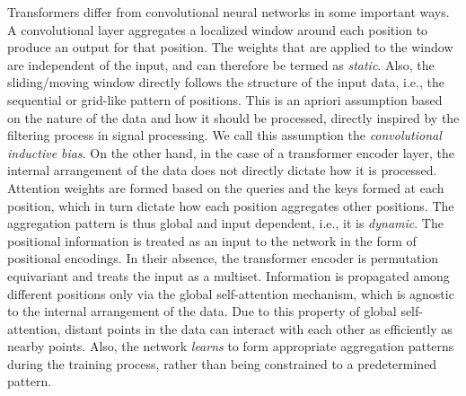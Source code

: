 \documentclass[sigconf,authorversion]{acmart}
\begin{document}
Transformers differ from convolutional neural networks in some important ways. A convolutional layer aggregates a localized window around each position to produce an output for that position. The weights that are applied to the window are independent of the input, and can therefore be termed as \emph{static}. Also, the sliding/moving window directly follows the structure of the input data, i.e., the sequential or grid-like pattern of positions. This is an apriori assumption based on the nature of the data and how it should be processed, directly inspired by the filtering process in signal processing. We call this assumption the \emph{convolutional inductive bias}. On the other hand, in the case of a transformer encoder layer, the internal arrangement of the data does not directly dictate how it is processed. Attention weights are formed based on the queries and the keys formed at each position, which in turn dictate how each position aggregates other positions. The aggregation pattern is thus global and input dependent, i.e., it is \emph{dynamic}. The positional information is treated as an input to the network in the form of positional encodings. In their absence, the transformer encoder is permutation equivariant and treats the input as a multiset. Information is propagated among different positions only via the global self-attention mechanism, which is agnostic to the internal arrangement of the data. Due to this property of global self-attention, distant points in the data can interact with each other as efficiently as nearby points. Also, the network \emph{learns} to form appropriate aggregation patterns during the training process, rather than being constrained to a predetermined pattern.
\end{document}
